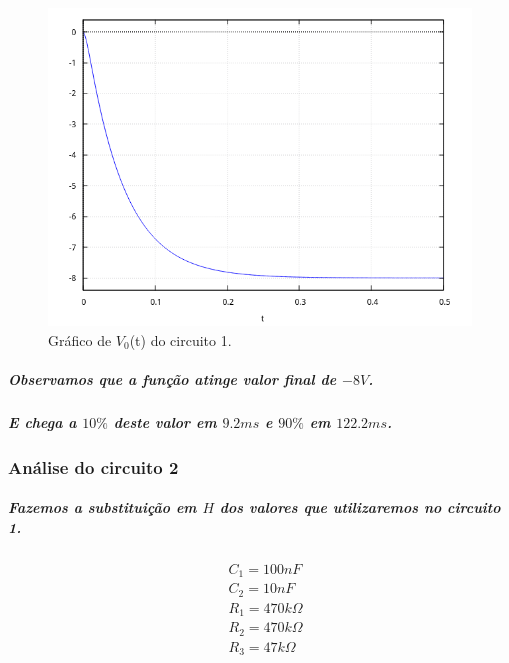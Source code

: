 \documentclass[12pt,twoside, a4paper, twocolumn]{article}
\begin{document}
\begin{figure}[h]
    \centering
    \includegraphics[width=1\columnwidth]{images/graficoH1t.png}
    \caption{Gráfico de $V_0$(t) do circuito 1.}
\end{figure}








\subparagraph*{Observamos que a função atinge valor final de $-8V$.}




\subparagraph*{E chega a $10\%$ deste valor em $9.2ms$ e $90\%$ em $122.2ms$.}




\subsubsection{Análise do circuito 2}




\subparagraph*{Fazemos a substituição em $H$ dos valores que utilizaremos no circuito 1.}








\begin{equation*}
    \begin{aligned}
         & C_1  = 100nF          \\
         & C_2  = 10nF           \\
         & R_1  = 470k \varOmega \\
         & R_2  = 470k \varOmega \\
         & R_3  = 47k \varOmega
    \end{aligned}
\end{equation*}
\end{document}
